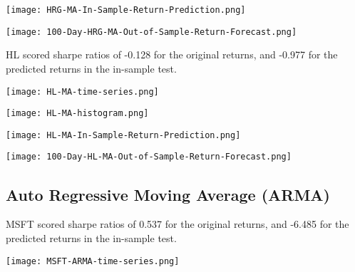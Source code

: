 \begin{center}
    \texttt{[image: HRG-MA-In-Sample-Return-Prediction.png]}
    \label{fig:nonfloat}
\end{center}

\begin{center}
    \texttt{[image: 100-Day-HRG-MA-Out-of-Sample-Return-Forecast.png]}
    \label{fig:nonfloat}
\end{center}

HL scored sharpe ratios of -0.128 for the original returns, and -0.977 for the predicted returns in the in-sample test.

\begin{center}
    \texttt{[image: HL-MA-time-series.png]}
    \label{fig:nonfloat}
\end{center}

\begin{center}
    \texttt{[image: HL-MA-histogram.png]}
    \label{fig:nonfloat}
\end{center}

\begin{center}
    \texttt{[image: HL-MA-In-Sample-Return-Prediction.png]}
    \label{fig:nonfloat}
\end{center}

\begin{center}
    \texttt{[image: 100-Day-HL-MA-Out-of-Sample-Return-Forecast.png]}
    \label{fig:nonfloat}
\end{center}

\subsection{Auto Regressive Moving Average (ARMA)}

MSFT scored sharpe ratios of 0.537 for the original returns, and -6.485 for the predicted returns in the in-sample test.

\begin{center}  
    \texttt{[image: MSFT-ARMA-time-series.png]}
    \label{fig:nonfloat}
\end{center}

